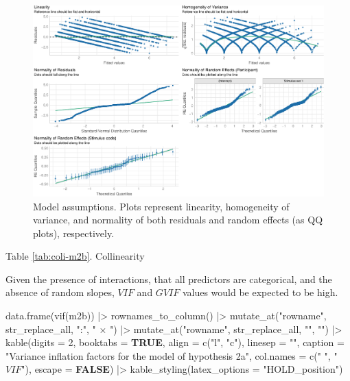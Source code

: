 \documentclass[
  bookmarksnumbered]{article}
\newenvironment{Shaded}{\begin{snugshade}}{\end{snugshade}}
\newcommand{\AttributeTok}[1]{\textcolor[rgb]{0.80,0.80,0.80}{#1}}
\newcommand{\ConstantTok}[1]{\textcolor[rgb]{0.86,0.64,0.64}{\textbf{#1}}}
\newcommand{\DecValTok}[1]{\textcolor[rgb]{0.86,0.86,0.80}{#1}}
\newcommand{\FunctionTok}[1]{\textcolor[rgb]{0.94,0.94,0.56}{#1}}
\newcommand{\NormalTok}[1]{\textcolor[rgb]{0.80,0.80,0.80}{#1}}
\newcommand{\SpecialCharTok}[1]{\textcolor[rgb]{0.86,0.64,0.64}{#1}}
\newcommand{\StringTok}[1]{\textcolor[rgb]{0.80,0.58,0.58}{#1}}
\begin{document}
\begin{figure}
\centering
\includegraphics{Deseo_excitacion_sexual_files/figure-latex/assu-m2b-1.pdf}
\caption{\label{fig:assu-m2b}Model assumptions. Plots represent linearity, homogeneity of variance, and normality of both residuals and random effects (as QQ plots), respectively.}
\end{figure}

Table \ref{tab:coli-m2b}. Collinearity

Given the presence of interactions, that all predictors are categorical, and the absence of random slopes, \(VIF\) and \(GVIF\) values would be expected to be high.

\begin{Shaded}
\begin{Highlighting}[]
\FunctionTok{data.frame}\NormalTok{(}\FunctionTok{vif}\NormalTok{(m2b)) }\SpecialCharTok{|\textgreater{}} 
  \FunctionTok{rownames\_to\_column}\NormalTok{() }\SpecialCharTok{|\textgreater{}} 
  \FunctionTok{mutate\_at}\NormalTok{(}\StringTok{"rowname"}\NormalTok{, str\_replace\_all, }\StringTok{":"}\NormalTok{, }\StringTok{" × "}\NormalTok{) }\SpecialCharTok{|\textgreater{}}
  \FunctionTok{mutate\_at}\NormalTok{(}\StringTok{"rowname"}\NormalTok{, str\_replace\_all, }\StringTok{"\textasciigrave{}"}\NormalTok{, }\StringTok{""}\NormalTok{) }\SpecialCharTok{|\textgreater{}} 
  \FunctionTok{kable}\NormalTok{(}\AttributeTok{digits =} \DecValTok{2}\NormalTok{,}
        \AttributeTok{booktabs =} \ConstantTok{TRUE}\NormalTok{,}
        \AttributeTok{align =} \FunctionTok{c}\NormalTok{(}\StringTok{"l"}\NormalTok{, }\StringTok{"c"}\NormalTok{),}
        \AttributeTok{linesep =} \StringTok{""}\NormalTok{,}
        \AttributeTok{caption =} \StringTok{"Variance inflation factors for the model of hypothesis 2a"}\NormalTok{,}
        \AttributeTok{col.names =} \FunctionTok{c}\NormalTok{(}\StringTok{" "}\NormalTok{,}
                      \StringTok{"$VIF$"}\NormalTok{),}
        \AttributeTok{escape =} \ConstantTok{FALSE}\NormalTok{) }\SpecialCharTok{|\textgreater{}}
  \FunctionTok{kable\_styling}\NormalTok{(}\AttributeTok{latex\_options =} \StringTok{"HOLD\_position"}\NormalTok{)}
\end{Highlighting}
\end{Shaded}
\end{document}
